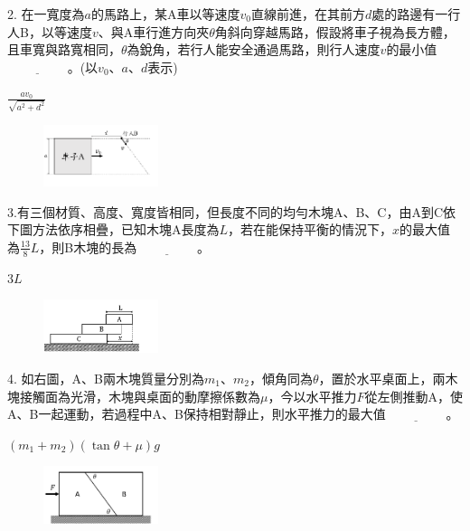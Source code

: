 \documentclass[cn,10pt,math=newtx,chinesefont=founder,device=ig]{elegantbook}
\begin{document}
\begin{example}
   2. 在一寬度為$a$的馬路上，某A車以等速度$v_0$直線前進，在其前方$d$處的路邊有一行人B，以等速度$v$、與A車行進方向夾$\theta$角斜向穿越馬路，假設將車子視為長方體，且車寬與路寬相同，$\theta$為銳角，若行人能安全通過馬路，則行人速度$v$的最小值$\underline{\hspace{2cm}}$。(以$v_0、a、d$表示)\\
    \rightline{[桃園高中教甄109]}
\end{example}
\begin{solution}
    $\frac{a v_0}{\sqrt{a^2 + d^2}}$
\end{solution}
\begin{figure}[htbp]
    \flushright
    \includegraphics[width=0.3\textwidth]{image/109桃園2.png}
  \end{figure}
\newpage

\begin{example}
   3.有三個材質、高度、寬度皆相同，但長度不同的均勻木塊A、B、C，由A到C依下圖方法依序相疊，已知木塊A長度為$L$，若在能保持平衡的情況下，$x$的最大值為$\frac{13}{8} L$，則B木塊的長為$\underline{\hspace{2cm}}$。\\
    \rightline{[桃園高中教甄109]}
\end{example}
\begin{solution}
    $3L$
\end{solution}
\begin{figure}[htbp]
    \flushright
    \includegraphics[width=0.3\textwidth]{image/109桃園3.png}
  \end{figure}
\newpage

\begin{example}
   4. 如右圖，A、B兩木塊質量分別為$m_1、m_2$，傾角同為$\theta$，置於水平桌面上，兩木塊接觸面為光滑，木塊與桌面的動摩擦係數為$\mu$，今以水平推力$F$從左側推動A，使A、B一起運動，若過程中A、B保持相對靜止，則水平推力的最大值$\underline{\hspace{2cm}}$。\\
    \rightline{[桃園高中教甄109]}
\end{example}
\begin{solution}
    $(m_1+m_2) (\tan{\theta}+\mu) g$
\end{solution}
\begin{figure}[htbp]
    \flushright
    \includegraphics[width=0.3\textwidth]{image/109桃園4.png}
  \end{figure}
\newpage
\end{document}

